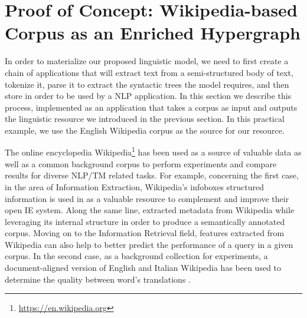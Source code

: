 \section{Proof of Concept: Wikipedia-based Corpus as an Enriched Hypergraph}

In order to materialize our proposed linguistic model, we need to first create a chain of applications that will extract text from a semi-structured body of text, tokenize it, parse it to extract the syntactic trees the model requires, and then store in order to be used by a NLP application. In this section we describe this process, implemented as an application that takes a corpus as input and outputs the linguistic resource we introduced in the previous section. In this practical example, we use the English Wikipedia corpus as the source for our resource.


The online encyclopedia Wikipedia\footnote{\url{https://en.wikipedia.org}} has been used as a source of valuable data as well as a common background corpus to perform experiments and compare results for diverse NLP/TM related tasks. For example, concerning the first case, in the area of Information Extraction, Wikipedia's infoboxes structured information is used in \cite{Wu2010} as a valuable resource to complement and improve their open IE system. Along the same line, \cite{charton2010}  extracted metadata from Wikipedia while leveraging its internal structure in order to produce a semantically annotated corpus. Moving on to the Information Retrieval field, features extracted from Wikipedia can also help to better predict the performance of a query  \cite{katz2014} in a given  corpus.  In the second case, as a background collection for experiments, a document-aligned version of English and Italian Wikipedia has been used to determine the quality between word's translations \cite{vulic2011}.  

